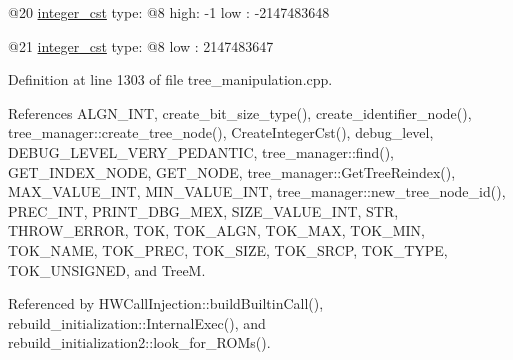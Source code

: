 @20 \hyperlink{structinteger__cst}{integer\+\_\+cst} type\+: @8 high\+: -\/1 low \+: -\/2147483648

@21 \hyperlink{structinteger__cst}{integer\+\_\+cst} type\+: @8 low \+: 2147483647 

Definition at line 1303 of file tree\+\_\+manipulation.\+cpp.



References A\+L\+G\+N\+\_\+\+I\+NT, create\+\_\+bit\+\_\+size\+\_\+type(), create\+\_\+identifier\+\_\+node(), tree\+\_\+manager\+::create\+\_\+tree\+\_\+node(), Create\+Integer\+Cst(), debug\+\_\+level, D\+E\+B\+U\+G\+\_\+\+L\+E\+V\+E\+L\+\_\+\+V\+E\+R\+Y\+\_\+\+P\+E\+D\+A\+N\+T\+IC, tree\+\_\+manager\+::find(), G\+E\+T\+\_\+\+I\+N\+D\+E\+X\+\_\+\+N\+O\+DE, G\+E\+T\+\_\+\+N\+O\+DE, tree\+\_\+manager\+::\+Get\+Tree\+Reindex(), M\+A\+X\+\_\+\+V\+A\+L\+U\+E\+\_\+\+I\+NT, M\+I\+N\+\_\+\+V\+A\+L\+U\+E\+\_\+\+I\+NT, tree\+\_\+manager\+::new\+\_\+tree\+\_\+node\+\_\+id(), P\+R\+E\+C\+\_\+\+I\+NT, P\+R\+I\+N\+T\+\_\+\+D\+B\+G\+\_\+\+M\+EX, S\+I\+Z\+E\+\_\+\+V\+A\+L\+U\+E\+\_\+\+I\+NT, S\+TR, T\+H\+R\+O\+W\+\_\+\+E\+R\+R\+OR, T\+OK, T\+O\+K\+\_\+\+A\+L\+GN, T\+O\+K\+\_\+\+M\+AX, T\+O\+K\+\_\+\+M\+IN, T\+O\+K\+\_\+\+N\+A\+ME, T\+O\+K\+\_\+\+P\+R\+EC, T\+O\+K\+\_\+\+S\+I\+ZE, T\+O\+K\+\_\+\+S\+R\+CP, T\+O\+K\+\_\+\+T\+Y\+PE, T\+O\+K\+\_\+\+U\+N\+S\+I\+G\+N\+ED, and TreeM.



Referenced by H\+W\+Call\+Injection\+::build\+Builtin\+Call(), rebuild\+\_\+initialization\+::\+Internal\+Exec(), and rebuild\+\_\+initialization2\+::look\+\_\+for\+\_\+\+R\+O\+Ms().

